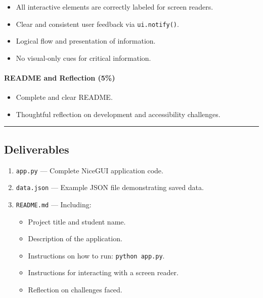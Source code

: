 \documentclass[
  justified,
  openright,
]{tufte-book}
\let\subsubsection\paragraph
\let\paragraph\paragraph
\let\subsubsection\paragraph
\let\paragraph\paragraph
\providecommand{\tightlist}{%
  \setlength{\itemsep}{0pt}\setlength{\parskip}{0pt}}
\begin{document}
\begin{itemize}
\tightlist
\item[$\square$]
  All interactive elements are correctly labeled for screen readers.
\item[$\square$]
  Clear and consistent user feedback via \texttt{ui.notify()}.
\item[$\square$]
  Logical flow and presentation of information.
\item[$\square$]
  No visual-only cues for critical information.
\end{itemize}

\subsubsection{README and Reflection
(5\%)}\label{readme-and-reflection-5}

\begin{itemize}
\tightlist
\item[$\square$]
  Complete and clear README.
\item[$\square$]
  Thoughtful reflection on development and accessibility challenges.
\end{itemize}

\begin{center}\rule{0.5\linewidth}{0.5pt}\end{center}

\subsection{Deliverables}\label{deliverables}

\begin{enumerate}
\def\labelenumi{\arabic{enumi}.}
\tightlist
\item
  \texttt{app.py} --- Complete NiceGUI application code.
\item
  \texttt{data.json} --- Example JSON file demonstrating saved data.
\item
  \texttt{README.md} --- Including:

  \begin{itemize}
  \tightlist
  \item
    Project title and student name.
  \item
    Description of the application.
  \item
    Instructions on how to run: \texttt{python\ app.py}.
  \item
    Instructions for interacting with a screen reader.
  \item
    Reflection on challenges faced.
  \end{itemize}
\end{enumerate}
\end{document}
